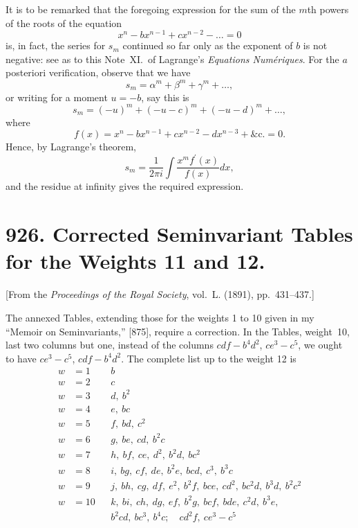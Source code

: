 \documentclass[11pt,a4paper]{book}
\begin{document}
It is to be remarked that the foregoing expression for the sum of the $m$th
powers of the roots of the equation
\[
x^n - bx^{n-1} + cx^{n-2} - \ldots = 0
\]
is, in fact, the series for $s_m$ continued so far only as the exponent of $b$ is not
negative: see as to this Note~XI.~of Lagrange's \textit{Equations Num\'eriques}. For the $a$
posteriori verification, observe that we have
\[
s_m = \alpha^m + \beta^m + \gamma^m + \ldots,
\]
or writing for a moment $u = -b$, say this is
\[
s_m = (-u)^m + (-u - c)^m + (-u - d)^m + \ldots,
\]
where
\[
f(x) = x^n - bx^{n-1} + cx^{n-2} - dx^{n-3} + \&\text{c.} = 0.
\]
Hence, by Lagrange's theorem,
\[
s_m = \frac{1}{2\pi i} \int \frac{x^m f^\prime(x)}{f(x)} dx,
\]
and the residue at infinity gives the required expression.



\newpage
\section*{926. Corrected Seminvariant Tables for the Weights 11 and 12.}

[From the \textit{Proceedings of the Royal Society}, vol.~L. (1891), pp.~431--437.]

\bigskip

The annexed Tables, extending those for the weights 1 to 10 given in my
``Memoir on Seminvariants,'' [875], require a correction. In the Tables, weight~10,
last two columns but one, instead of the columns $cdf - b^4d^2$, $ce^3 - c^5$, we ought to have
$ce^3 - c^5$, $cdf - b^4d^2$. The complete list up to the weight 12 is
\begin{align*}
w &= 1 && b\\
w &= 2 && c\\
w &= 3 && d,\ b^2\\
w &= 4 && e,\ bc\\
w &= 5 && f,\ bd,\ c^2\\
w &= 6 && g,\ be,\ cd,\ b^2c\\
w &= 7 && h,\ bf,\ ce,\ d^2,\ b^2d,\ bc^2\\
w &= 8 && i,\ bg,\ cf,\ de,\ b^2e,\ bcd,\ c^3,\ b^3c\\
w &= 9 && j,\ bh,\ cg,\ df,\ e^2,\ b^2f,\ bce,\ cd^2,\ bc^2d,\ b^3d,\ b^2c^2\\
w &= 10 && k,\ bi,\ ch,\ dg,\ ef,\ b^2g,\ bcf,\ bde,\ c^2d,\ b^3e,\\
&&& b^2cd,\ bc^3,\ b^4c;\quad cd^2f,\ ce^3 - c^5
\end{align*}
\end{document}
